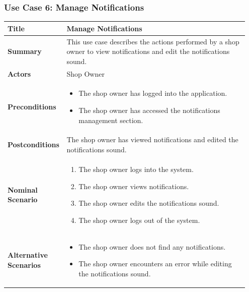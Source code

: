 \subsubsection{Use Case 6: Manage Notifications}
\begin{longtable}{|p{0.2\linewidth}|p{0.75\linewidth}|}
\hline
\textbf{Title} & Manage Notifications \\
\hline
\textbf{Summary} & This use case describes the actions performed by a shop owner to view notifications and edit the notifications sound. \\
\hline
\textbf{Actors} & Shop Owner \\
\hline
\textbf{Preconditions} &
\begin{itemize}
    \item The shop owner has logged into the application.
    \item The shop owner has accessed the notifications management section.
\end{itemize} \\
\hline
\textbf{Postconditions} & The shop owner has viewed notifications and edited the notifications sound. \\
\hline
\textbf{Nominal Scenario} &
\begin{enumerate}
    \item The shop owner logs into the system.
    \item The shop owner views notifications.
    \item The shop owner edits the notifications sound.
    \item The shop owner logs out of the system.
\end{enumerate} \\
\hline
\textbf{Alternative Scenarios} &
\begin{itemize}
    \item The shop owner does not find any notifications.
    \item The shop owner encounters an error while editing the notifications sound.
\end{itemize} \\
\hline
\end{longtable}

